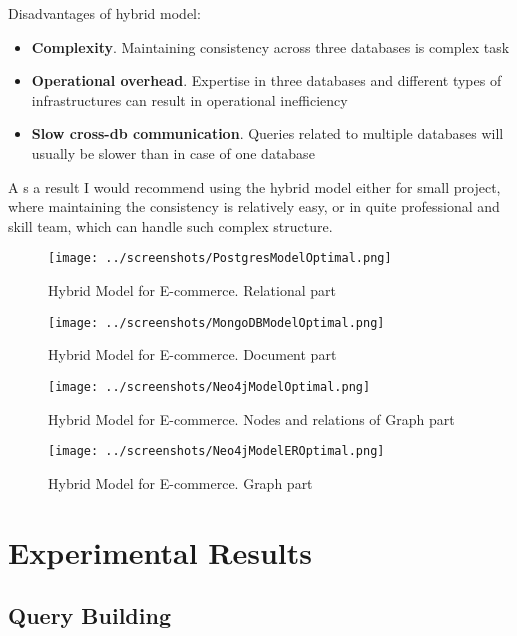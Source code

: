\documentclass[conference]{IEEEtran}
\begin{document}
Disadvantages of hybrid model:
\begin{itemize}
    \item \textbf{Complexity}. Maintaining consistency across three databases is complex task
    \item \textbf{Operational overhead}. Expertise in three databases and different types of infrastructures can result in operational inefficiency
    \item \textbf{Slow cross-db communication}. Queries related to multiple databases will usually be slower than in case of one database
\end{itemize}
A
s a result I would recommend using the hybrid model either for small project, where maintaining the consistency is relatively easy, or in quite professional and skill team, which can handle such complex structure.

\begin{figure}[htbp]
    \centerline{\texttt{[image: ../screenshots/PostgresModelOptimal.png]}}
    \caption{Hybrid Model for E-commerce. Relational part}\label{fig:postgres_optimal}
\end{figure}

\begin{figure}[htbp]
    \centerline{\texttt{[image: ../screenshots/MongoDBModelOptimal.png]}}
    \caption{Hybrid Model for E-commerce. Document part}\label{fig:mongo_optimal}
\end{figure}


\begin{figure}[htbp]
    \centerline{\texttt{[image: ../screenshots/Neo4jModelOptimal.png]}}
    \caption{Hybrid Model for E-commerce. Nodes and relations of Graph part}\label{fig:neo4j_optimal}
\end{figure}

\begin{figure}[htbp]
    \centerline{\texttt{[image: ../screenshots/Neo4jModelEROptimal.png]}}
    \caption{Hybrid Model for E-commerce. Graph part}\label{fig:neo4j_eroptimal}
\end{figure}

\section{Experimental Results}

\subsection{Query Building}
\end{document}
